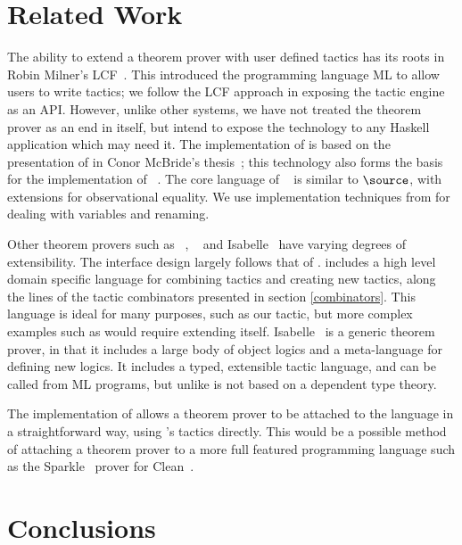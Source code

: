 \section{Related Work}

The ability to extend a theorem prover with user defined tactics has
its roots in Robin Milner's LCF~\cite{lcf-milner}. This introduced the
programming language ML to allow users to write tactics; we follow the
LCF approach in exposing the tactic engine as an API. However, unlike
other systems, we have not treated the theorem prover as an end in
itself, but intend to expose the technology to any Haskell application
which may need it.  The implementation of \Ivor{} is based on the
presentation of \Oleg{} in Conor McBride's
thesis~\cite{mcbride-thesis}; this technology also forms the basis for
the implementation of \Epigram{}~\cite{view-left}. The core language
of \Epigram{}~\cite{epireloaded} is similar to $\source$, with
extensions for observational equality. We use implementation
techniques from \cite{not-a-number} for dealing with variables and
renaming.

Other theorem provers such as \Coq{}~\cite{coq-manual},
\Agda{}~\cite{agda} and Isabelle~\cite{isabelle} have varying degrees
of extensibility. The interface design largely follows that of
\Coq{}. \Coq{} includes a high level domain specific language for
combining tactics and creating new tactics, along the lines of the
tactic combinators presented in section \ref{combinators}. This
language is ideal for many purposes, such as our 
tactic, but more complex examples such as  would
require extending \Coq{} itself.  Isabelle~\cite{isabelle} is a
generic theorem prover, in that it includes a large body of object
logics and a meta-language for defining new logics. It includes a
typed, extensible tactic language, and can be called from ML programs,
but unlike \Ivor{} is not based on a dependent type theory.

The implementation of \Funl{} allows a theorem prover to be attached
to the language in a straightforward way, using \Ivor{}'s tactics
directly. This would be a possible method of attaching a theorem
prover to a more full featured programming language such as the
Sparkle~\cite{sparkle} prover for Clean~\cite{clean}.

\section{Conclusions}

